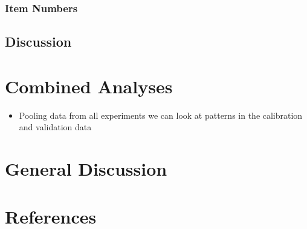 \documentclass[
  english,
  man,floatsintext]{apa6}
\providecommand{\tightlist}{%
  \setlength{\itemsep}{0pt}\setlength{\parskip}{0pt}}
\begin{document}
\hypertarget{item-numbers}{%
\subsubsection{Item Numbers}\label{item-numbers}}

\hypertarget{discussion-5}{%
\subsection{Discussion}\label{discussion-5}}

\hypertarget{combined-analyses}{%
\section{Combined Analyses}\label{combined-analyses}}

\begin{itemize}
\tightlist
\item
  Pooling data from all experiments we can look at patterns in the calibration and validation data
\end{itemize}

\hypertarget{general-discussion}{%
\section{General Discussion}\label{general-discussion}}

\newpage

\hypertarget{references}{%
\section{References}\label{references}}

\begingroup
\setlength{\parindent}{-0.5in}
\setlength{\leftskip}{0.5in}
\end{document}
